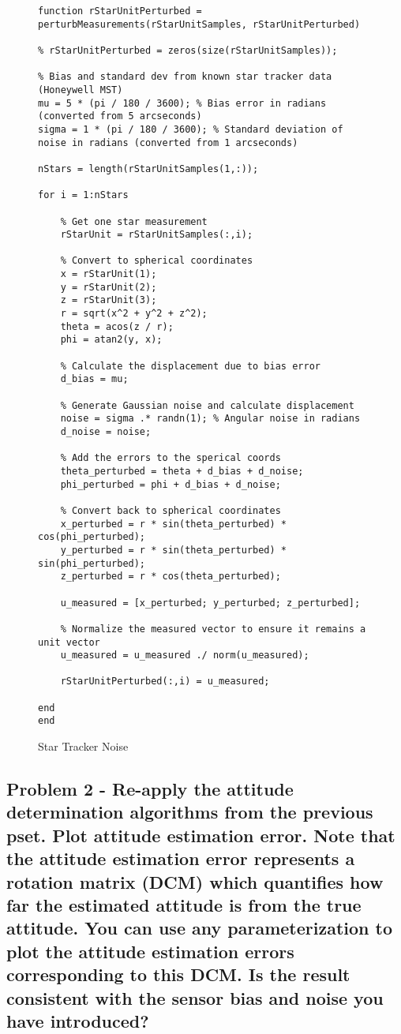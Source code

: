 \begin{figure} [H]
    \centering
    \begin{lstlisting}
function rStarUnitPerturbed = perturbMeasurements(rStarUnitSamples, rStarUnitPerturbed)

% rStarUnitPerturbed = zeros(size(rStarUnitSamples));

% Bias and standard dev from known star tracker data (Honeywell MST)
mu = 5 * (pi / 180 / 3600); % Bias error in radians (converted from 5 arcseconds)
sigma = 1 * (pi / 180 / 3600); % Standard deviation of noise in radians (converted from 1 arcseconds)

nStars = length(rStarUnitSamples(1,:));

for i = 1:nStars

    % Get one star measurement
    rStarUnit = rStarUnitSamples(:,i);

    % Convert to spherical coordinates
    x = rStarUnit(1);
    y = rStarUnit(2); 
    z = rStarUnit(3);
    r = sqrt(x^2 + y^2 + z^2);
    theta = acos(z / r);
    phi = atan2(y, x);
    
    % Calculate the displacement due to bias error
    d_bias = mu;
    
    % Generate Gaussian noise and calculate displacement
    noise = sigma .* randn(1); % Angular noise in radians
    d_noise = noise;
    
    % Add the errors to the sperical coords
    theta_perturbed = theta + d_bias + d_noise;
    phi_perturbed = phi + d_bias + d_noise;
    
    % Convert back to spherical coordinates
    x_perturbed = r * sin(theta_perturbed) * cos(phi_perturbed);
    y_perturbed = r * sin(theta_perturbed) * sin(phi_perturbed);
    z_perturbed = r * cos(theta_perturbed);
    
    u_measured = [x_perturbed; y_perturbed; z_perturbed];
    
    % Normalize the measured vector to ensure it remains a unit vector
    u_measured = u_measured ./ norm(u_measured);

    rStarUnitPerturbed(:,i) = u_measured;
    
end
end
    \end{lstlisting}
    \caption{Star Tracker Noise}
    \label{fig:starTrackerNoise}
\end{figure}

\subsection{Problem 2 - Re-apply the attitude determination algorithms from the previous pset. Plot attitude estimation error. Note that the attitude estimation error represents a rotation matrix (DCM) which quantifies how far the estimated
attitude is from the true attitude. You can use any parameterization to plot the attitude estimation errors corresponding to this DCM. Is the result consistent with the sensor bias and noise you have introduced?}


